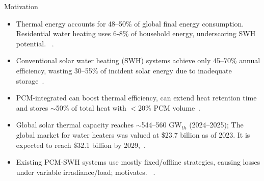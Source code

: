 \documentclass[aspectratio=169, 11pt]{beamer}
\begin{document}
\begin{frame}{Motivation}
\begin{itemize}
    \item Thermal energy accounts for 48--50\% of global final energy consumption. Residential water heating uses 6-8\% of household energy, underscoring SWH potential. ~\cite{duraivel2025performance}.
    \item Conventional solar water heating (SWH) systems achieve only 45--70\% annual efficiency, wasting 30--55\% of incident solar energy due to inadequate storage~\cite{AlMamun2023SWHReview}.
    \item PCM-integrated can boost thermal efficiency, can extend heat retention time and stores $\sim$50\% of total heat with $<$20\% PCM volume~\cite{Chen2025TaguchiPCM}.
    \item Global solar thermal capacity reaches $\sim$544--560 GW$_{th}$ (2024--2025); The global market for water heaters was valued at \$23.7 billion as of 2023. It is expected to reach \$32.1 billion by 2029,~\cite{OdoiYorke2025AI_SWH}.
    \item Existing PCM-SWH systems use mostly fixed/offline strategies, causing losses under variable irradiance/load; motivates. ~\cite{OdoiYorke2025AI_SWH, Chen2025TaguchiPCM}.
\end{itemize}
\end{frame}


\end{document}
